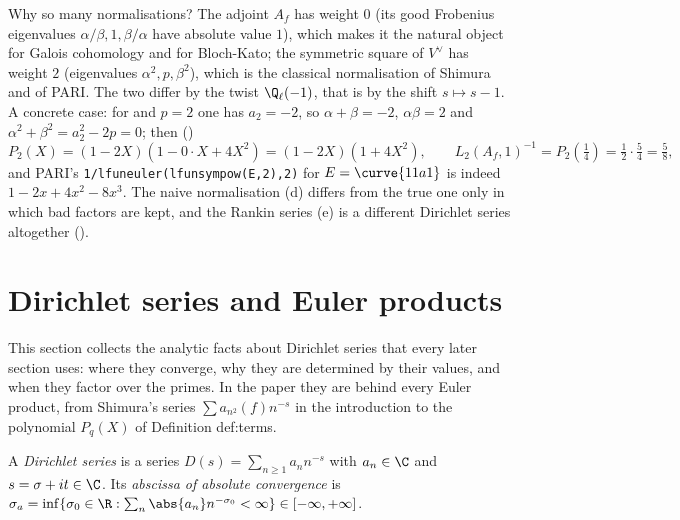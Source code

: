 Why so many normalisations? The adjoint $A_f$ has weight $0$ (its good Frobenius eigenvalues $\alpha/\beta,1,\beta/\alpha$ have absolute value $1$), which makes it the natural
object for Galois cohomology and for Bloch-Kato; the symmetric square of $V^\vee$ has weight $2$ (eigenvalues $\alpha^2,p,\beta^2$), which is the classical normalisation of
Shimura and of PARI. The two differ by the twist $\Q_\ell(-1)$, that is by the shift $s\mapsto s-1$. A concrete case: for  and $p=2$ one has $a_2=-2$, so
$\alpha+\beta=-2$, $\alpha\beta=2$ and $\alpha^2+\beta^2=a_2^2-2p=0$; then ()
\[
P_2(X)=(1-2X)(1-0\cdot X+4X^2)=(1-2X)(1+4X^2),\qquad L_2(A_f,1)^{-1}=P_2(\tfrac14)=\tfrac12\cdot\tfrac54=\tfrac58,
\]
and PARI's \texttt{1/lfuneuler(lfunsympow(E,2),2)} for $E=\curve{11a1}$ is indeed $1-2x+4x^2-8x^3$. The naive normalisation (d) differs from the true one only in which bad
factors are kept, and the Rankin series (e) is a different Dirichlet series altogether ().

\section{Dirichlet series and Euler products}\label{sec:lfunctions:dirichlet}

This section collects the analytic facts about Dirichlet series that every later section uses: where they converge, why they are determined by their
values, and when they factor over the primes. In the paper they are behind every Euler product, from Shimura's series $\sum a_{n^2}(f)n^{-s}$ in the
introduction to the polynomial $P_q(X)$ of Definition def:terms.

\begin{definition}\label{def:lfunctions:dirichlet-series}
A \emph{Dirichlet series} is a series $D(s)=\sum_{n\ge1}a_nn^{-s}$ with $a_n\in\C$ and $s=\sigma+it\in\C$. Its \emph{abscissa of absolute convergence} is
$\sigma_a=\inf\{\sigma_0\in\R:\sum_n\abs{a_n}n^{-\sigma_0}<\infty\}\in[-\infty,+\infty]$.
\end{definition}

